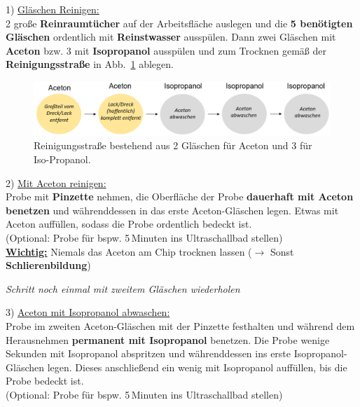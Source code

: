 \documentclass[
  ngerman,
  twoside,
  captions=tableheading,
  BCOR=.5cm,
  fontsize=11,
  ]{scrreprt}
\begin{document}
\begin{description}
\item 1) \underline{Gläschen Reinigen:}\\
2 große \textbf{Reinraumtücher} auf der Arbeitsfläche auslegen und die \textbf{5 benötigten Gläschen} ordentlich mit \textbf{Reinstwasser} ausspülen. Dann zwei Gläschen mit \textbf{Aceton} bzw. 3 mit \textbf{Isopropanol} ausspülen und zum Trocknen gemäß der \textbf{Reinigungsstraße} in Abb.~\ref{Reinigungsstraße} ablegen.

\begin{figure}[h]
\centering
\includegraphics[scale=0.6]{Bilder/Ace_Iso_Schema.PNG}
\caption{Reinigungsstraße bestehend aus 2 Gläschen für Aceton und 3 für Iso-Propanol.}\label{Reinigungsstraße}
\end{figure}

\item 2) \underline{Mit Aceton reinigen:}\\
Probe mit \textbf{Pinzette} nehmen, die Oberfläche der Probe \textbf{dauerhaft mit Aceton benetzen} und währenddessen in das erste Aceton-Gläschen legen. Etwas mit Aceton auffüllen, sodass die Probe ordentlich bedeckt ist.\\
(Optional: Probe für bspw. 5\,Minuten ins Ultraschallbad stellen)\\

\underline{\textbf{Wichtig:}} Niemals das Aceton am Chip trocknen lassen ($\rightarrow$ Sonst \textbf{Schlierenbildung})
\begin{center}
\textit{Schritt noch einmal mit zweitem Gläschen wiederholen}
\end{center}

\item 3) \underline{Aceton mit Isopropanol abwaschen:}\\
Probe im zweiten Aceton-Gläschen mit der Pinzette festhalten und während dem Herausnehmen \textbf{permanent mit Isopropanol} benetzen. Die Probe wenige Sekunden mit Isopropanol abspritzen und währenddessen ins erste Isopropanol-Gläschen legen. Dieses anschließend ein wenig mit Isopropanol auffüllen, bis die Probe bedeckt ist.\\
(Optional: Probe für bspw. 5\,Minuten ins Ultraschallbad stellen)\\


\end{description}
\end{document}

